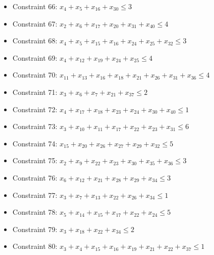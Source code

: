 \documentclass[11pt]{article}
\begin{document}
\begin{itemize}
\item Constraint 66: $x_{4} + x_{5} + x_{16} + x_{30} \le 3$
\item Constraint 67: $x_{2} + x_{6} + x_{17} + x_{20} + x_{31} + x_{40} \le 4$
\item Constraint 68: $x_{4} + x_{5} + x_{15} + x_{16} + x_{24} + x_{25} + x_{32} \le 3$
\item Constraint 69: $x_{4} + x_{12} + x_{19} + x_{24} + x_{25} \le 4$
\item Constraint 70: $x_{11} + x_{13} + x_{16} + x_{18} + x_{21} + x_{26} + x_{31} + x_{36} \le 4$
\item Constraint 71: $x_{3} + x_{6} + x_{7} + x_{21} + x_{37} \le 2$
\item Constraint 72: $x_{4} + x_{17} + x_{18} + x_{23} + x_{24} + x_{30} + x_{40} \le 1$
\item Constraint 73: $x_{3} + x_{10} + x_{11} + x_{17} + x_{22} + x_{23} + x_{31} \le 6$
\item Constraint 74: $x_{15} + x_{20} + x_{26} + x_{27} + x_{29} + x_{32} \le 5$
\item Constraint 75: $x_{2} + x_{9} + x_{22} + x_{23} + x_{30} + x_{35} + x_{36} \le 3$
\item Constraint 76: $x_{6} + x_{12} + x_{21} + x_{28} + x_{29} + x_{34} \le 3$
\item Constraint 77: $x_{3} + x_{7} + x_{13} + x_{22} + x_{26} + x_{34} \le 1$
\item Constraint 78: $x_{5} + x_{14} + x_{15} + x_{17} + x_{22} + x_{24} \le 5$
\item Constraint 79: $x_{3} + x_{18} + x_{22} + x_{34} \le 2$
\item Constraint 80: $x_{3} + x_{4} + x_{15} + x_{16} + x_{19} + x_{21} + x_{22} + x_{37} \le 1$
\end{itemize}
\end{document}
